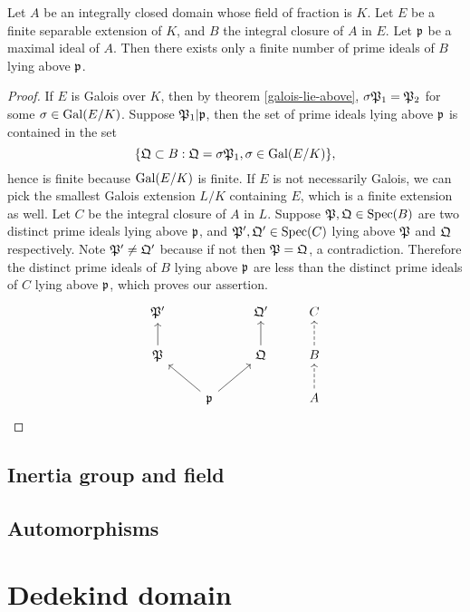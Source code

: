 			\begin{corollary} 
				Let $A$ be an integrally closed domain whose field of fraction is $K$. Let $E$ be a finite separable extension of $K$, and $B$ the integral closure of $A$ in $E$. Let $\mathfrak{p}$ be a maximal ideal of $A$. Then there exists only a finite number of prime ideals of $B$ lying above $\mathfrak{p}$.
			\end{corollary}
			\begin{proof}
				 If $E$ is Galois over $K$, then by theorem \ref{galois-lie-above}, $\sigma\mathfrak{P}_1 = \mathfrak{P}_2$ for some $\sigma \in \operatorname{Gal}(E/K)$. Suppose $\mathfrak{P}_1|\mathfrak{p}$, then the set of prime ideals lying above $\mathfrak{p}$ is contained in the set
				\[
					\{\mathfrak{Q} \subset B: \mathfrak{Q}=\sigma\mathfrak{P}_1,\sigma\in\operatorname{Gal}(E/K)\},
				\]
				hence is finite because $\operatorname{Gal}(E/K)$ is finite. If $E$ is not necessarily Galois, we can pick the smallest Galois extension $L/K$ containing $E$, which is a finite extension as well. Let $C$ be the integral closure of $A$ in $L$. Suppose $\mathfrak{P},\mathfrak{Q} \in \operatorname{Spec}(B)$ are two distinct prime ideals lying above $\mathfrak{p}$, and $\mathfrak{P}',\mathfrak{Q}' \in \operatorname{Spec}(C)$ lying above $\mathfrak{P}$ and $\mathfrak{Q}$ respectively. Note $\mathfrak{P}' \ne \mathfrak{Q}'$ because if not then $\mathfrak{P}=\mathfrak{Q}$, a contradiction. Therefore the distinct prime ideals of $B$ lying above $\mathfrak{p}$ are less than the distinct prime ideals of $C$ lying above $\mathfrak{p}$, which proves our assertion.
				\[
					\begin{tikzcd}
						\mathfrak{P}'          &                                    & \mathfrak{Q}'          & C                   \\
						\mathfrak{P} \arrow[u] &                                    & \mathfrak{Q} \arrow[u] & B \arrow[u, dashed] \\
						& \mathfrak{p} \arrow[lu] \arrow[ru] &                        & A \arrow[u, dashed]
					\end{tikzcd}
				\]
			\end{proof}
		\subsection{Inertia group and field}
		\subsection{Automorphisms}
	\section{Dedekind domain}
		
